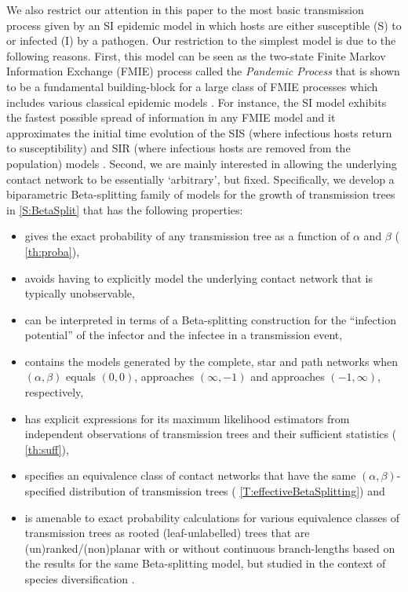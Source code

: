 \documentclass[review]{elsarticle}
\numberwithin{equation}{section}
\let\orgautoref\autoref
\renewcommand{\autoref}
        {\def\equationautorefname{Eq.}%
         \def\figureautorefname{Fig.}%
         \def\subfigureautorefname{Fig.}%
         \def\sectionautorefname{Sect.}%
         \def\subsectionautorefname{Sect.}%
         \def\subsubsectionautorefname{Sect.}%
         \def\Itemautorefname{item}%
         \def\tableautorefname{Table}%
         \def\propositionautorefname{Prop.}%
         \def\corollaryautorefname{Corollary}%
         \def\theoremautorefname{Theorem}%
         \def\remarkautorefname{Remark}%
         \def\lemmaautorefname{Lemma}%
         \def\proofofautorefname{Proof}%
         \def\exampleautorefname{Example}%
         \orgautoref}
\begin{document}
We also restrict our attention in this paper to the most basic transmission process given by an SI epidemic model in which hosts are either susceptible (S) to  or infected (I) by a pathogen.  
Our restriction to the simplest model is due to the following reasons.  
First, this model can be seen as the two-state Finite Markov Information Exchange (FMIE) process \citep[Sec.~2.2]{AldousIPSSSD2013} called the {\em Pandemic Process} \citep[Sec.~7]{AldousIPSSSD2013} that is shown to be a fundamental building-block \citep[Sec.~3.2,7]{AldousIPSSSD2013} for a large class of FMIE processes which includes various classical epidemic models \cite[see][Sec.~8,9 and references therein]{AldousIPSSSD2013}.  
For instance, the SI model exhibits the fastest possible spread of information in any FMIE model \citep[Sec.~3.2]{AldousIPSSSD2013} and it approximates the initial time evolution of the SIS (where infectious hosts return to susceptibility) and SIR (where infectious hosts are removed from the population) models \citep[II.A]{pastor2015}.  
Second, we are mainly interested in allowing the underlying contact network to be essentially `arbitrary', but fixed.  
Specifically, we develop a biparametric Beta-splitting family of models for the growth of transmission trees in \autoref{S:BetaSplit} that has the following properties:
\begin{itemize}
\item gives the exact probability of any transmission tree as a function of $\alpha$ and $\beta$ (\autoref{th:proba}),
\item avoids having to explicitly model the underlying contact network that is typically unobservable,
\item can be interpreted in terms of a Beta-splitting construction for the ``infection potential'' of the infector and the infectee in a transmission event, 
\item contains the models generated by the complete, star and path networks when $(\alpha,\beta)$ equals $(0,0)$, approaches $(\infty,-1)$ and approaches $(-1,\infty)$, respectively,
\item has explicit expressions for its maximum likelihood estimators from independent observations of transmission trees and their sufficient statistics (\autoref{th:suff}),
\item specifies an equivalence class of contact networks that have the same $(\alpha,\beta)$-specified distribution of transmission trees (\autoref{T:effectiveBetaSplitting}) and
\item is amenable to exact probability calculations for various equivalence classes of transmission trees as rooted (leaf-unlabelled) trees that are (un)ranked/(non)planar with or without continuous branch-lengths based on the results for the same Beta-splitting model, but studied in the context of species diversification \citep{SainudiinVeber2016}.
\end{itemize}
\end{document}

